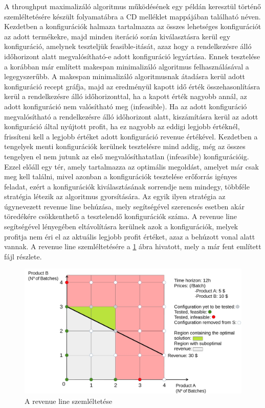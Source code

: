 A throughput maximalizáló algoritmus működésének egy példán keresztül történő szemléltetésére készült folyamatábra a CD melléklet  mappájában található  néven.
Kezdetben a konfigurációk halmaza tartalmazza az összes lehetséges konfigurációt az adott termékekre, majd minden iteráció során kiválasztásra kerül egy konfiguráció, amelynek teszteljük feasible-itását, azaz hogy a rendelkezésre álló időhorizont alatt megvalósítható-e adott konfiguráció legyártása.
Ennek tesztelése a korábban már említett makespan minimalizáló algoritmus felhasználásával a legegyszerűbb.
A makespan minimalizáló algoritmusnak átadásra kerül adott konfiguráció recept gráfja, majd az eredményül kapott idő érték összehasonlításra kerül a rendelkezésre álló időhorizonttal, ha a kapott érték nagyobb annál, az adott konfiguráció nem valósítható meg (infeasible). 
Ha az adott konfiguráció megvalósítható a rendelkezésre álló időhorizont alatt, kiszámításra kerül az adott konfiguráció által nyújtott profit, ha ez nagyobb az eddigi legjobb értéknél, frissíteni kell a legjobb értéket adott konfiguráció revenue értékével.
Kezdetben a tengelyek menti konfigurációk kerülnek tesztelésre mind addig, még az összes tengelyen el nem jutunk az első megvalósíthatatlan (infeasible) konfigurációig.
Ezzel előáll egy tér, amely tartalmazza az optimális megoldást, amelyet már csak meg kell találni, mivel azonban a konfigurációk tesztelése erőforrás igényes feladat, ezért a konfigurációk kiválasztásának sorrendje nem mindegy, többféle stratégia létezik az algoritmus gyorsítására. \cite{phd_Hegyhati}
Az egyik ilyen stratégia az úgynevezett revenue line behúzása, mely segítségével szerencsés esetben akár töredékére csökkenthető a tesztelendő konfigurációk száma.
A revenue line segítségével lényegében eltávolításra kerülnek azok a konfigurációk, melyek profitja nem éri el az aktuális legjobb profit értéket, azaz a behúzott vonal alatt vannak.
A revenue line szemléltetésére a \ref{revLine} ábra hivatott, mely a már fent említett   fájl részlete.
 \begin{figure}[H]
\begin{center}
\includegraphics[scale=0.3]{revLine}
\caption{A revenue line szemléltetése}
\label{revLine}
\end{center}
\end{figure}
